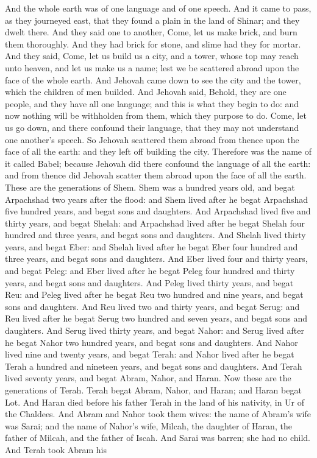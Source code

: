 And the whole earth was of one language and of one speech. And it came to pass, as they journeyed east, that they found a plain in the land of Shinar; and they dwelt there. And they said one to another, Come, let us make brick, and burn them thoroughly. And they had brick for stone, and slime had they for mortar. And they said, Come, let us build us a city, and a tower, whose top may reach unto heaven, and let us make us a name; lest we be scattered abroad upon the face of the whole earth. And Jehovah came down to see the city and the tower, which the children of men builded. And Jehovah said, Behold, they are one people, and they have all one language; and this is what they begin to do: and now nothing will be withholden from them, which they purpose to do. Come, let us go down, and there confound their language, that they may not understand one another’s speech. So Jehovah scattered them abroad from thence upon the face of all the earth: and they left off building the city. Therefore was the name of it called Babel; because Jehovah did there confound the language of all the earth: and from thence did Jehovah scatter them abroad upon the face of all the earth.  These are the generations of Shem. Shem was a hundred years old, and begat Arpachshad two years after the flood: and Shem lived after he begat Arpachshad five hundred years, and begat sons and daughters.  And Arpachshad lived five and thirty years, and begat Shelah: and Arpachshad lived after he begat Shelah four hundred and three years, and begat sons and daughters.  And Shelah lived thirty years, and begat Eber: and Shelah lived after he begat Eber four hundred and three years, and begat sons and daughters.  And Eber lived four and thirty years, and begat Peleg: and Eber lived after he begat Peleg four hundred and thirty years, and begat sons and daughters.  And Peleg lived thirty years, and begat Reu: and Peleg lived after he begat Reu two hundred and nine years, and begat sons and daughters.  And Reu lived two and thirty years, and begat Serug: and Reu lived after he begat Serug two hundred and seven years, and begat sons and daughters.  And Serug lived thirty years, and begat Nahor: and Serug lived after he begat Nahor two hundred years, and begat sons and daughters.  And Nahor lived nine and twenty years, and begat Terah: and Nahor lived after he begat Terah a hundred and nineteen years, and begat sons and daughters.  And Terah lived seventy years, and begat Abram, Nahor, and Haran.  Now these are the generations of Terah. Terah begat Abram, Nahor, and Haran; and Haran begat Lot. And Haran died before his father Terah in the land of his nativity, in Ur of the Chaldees. And Abram and Nahor took them wives: the name of Abram’s wife was Sarai; and the name of Nahor’s wife, Milcah, the daughter of Haran, the father of Milcah, and the father of Iscah. And Sarai was barren; she had no child. And Terah took Abram his 